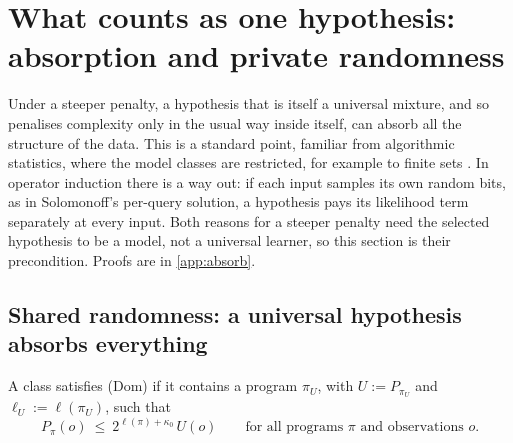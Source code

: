 \section{What counts as one hypothesis: absorption and private randomness}\label{sec:absorb}

Under a steeper penalty, a hypothesis that is itself a universal mixture, and so penalises complexity only in the usual way inside itself, can absorb all the structure of the data. This is a standard point, familiar from algorithmic statistics, where the model classes are restricted, for example to finite sets \citep{gacs2001algorithmic,vereshchagin2017algorithmic}. In operator induction there is a way out: if each input samples its own random bits, as in Solomonoff's per-query solution, a hypothesis pays its likelihood term separately at every input. Both reasons for a steeper penalty need the selected hypothesis to be a model, not a universal learner, so this section is their precondition. Proofs are in \cref{app:absorb}.

\subsection{Shared randomness: a universal hypothesis absorbs everything}\label{sec:absorb:shared}

A class satisfies (Dom) if it contains a program $\pi_U$, with $U:=P_{\pi_U}$ and $\ell_U:=\ell(\pi_U)$, such that
\begin{equation}\label{eq:absorb:dom}
P_\pi(o)\ \le\ 2^{\ell(\pi)+\kappa_0}\,U(o)\qquad\text{for all programs $\pi$ and observations $o$.}\tag{Dom}
\end{equation}

